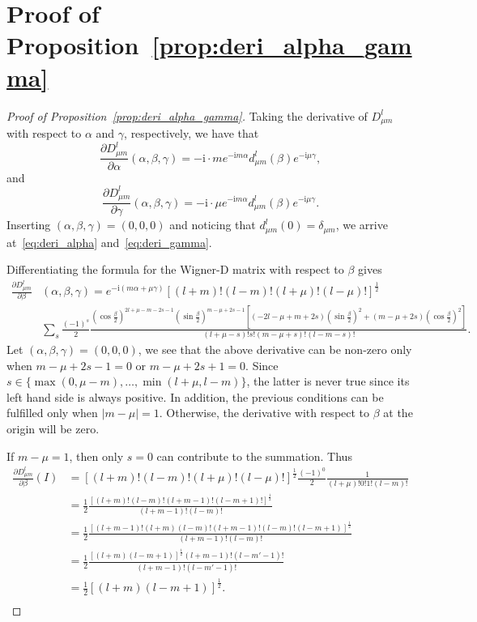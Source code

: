 \documentclass{article}
\numberwithin{equation}{section}
\begin{document}
\section{Proof of Proposition~\ref{prop:deri_alpha_gamma}}\label{app:Wigner-Dmatricesproof}
\begin{proof}[Proof of Proposition~\ref{prop:deri_alpha_gamma}]
Taking the derivative of $D^l_{\mu m}$ with respect to $\alpha$ and $\gamma$, respectively, we have that
\[
    \frac{\partial D^l_{\mu m}}{\partial \alpha}(\alpha, \beta, \gamma)  = -\mathrm{i}\cdot me^{-\mathrm{i}m\alpha}d^l_{\mu m}(\beta)e^{-\mathrm{i}\mu\gamma},
\]
and
\[
    \frac{\partial D^l_{\mu m}}{\partial \gamma}(\alpha, \beta, \gamma)  = -\mathrm{i}\cdot \mu e^{-\mathrm{i}m\alpha}d^l_{\mu m}(\beta)e^{-\mathrm{i}\mu\gamma}.
\]
Inserting $(\alpha,\beta,\gamma) = (0,0,0)$ and noticing that $d_{\mu m}^l(0) = \delta_{\mu m}$, we arrive at~\eqref{eq:deri_alpha} and~\eqref{eq:deri_gamma}.

Differentiating the formula for the Wigner-D matrix with respect to $\beta$ gives
\begin{align*}
    \frac{\partial D^l_{\mu m}}{\partial \beta} & (\alpha, \beta, \gamma) = e^{-\mathrm{i}(m\alpha+ \mu\gamma)} [(l+m)!(l-m)!(l+\mu)!(l-\mu)!]^{\frac12} \\ &\sum_s \frac{(-1)^{s}}{2}\frac{(\cos\frac{\beta}{2})^{2l + \mu - m - 2s - 1}(\sin\frac{\beta}{2})^{m-\mu+2s-1}[(-2l-\mu+m+2s)(\sin\frac{\beta}{2})^2 + (m-\mu+2s)(\cos\frac{\beta}{2})^2]}{(l+\mu-s)!s! (m-\mu+s)!(l-m-s)!}.
\end{align*}
Let $(\alpha,\beta,\gamma) = (0,0,0)$, we see that the above derivative can be non-zero only when $m-\mu+2s-1=0$ or $m-\mu+2s+1=0$. Since $s\in \{\max(0, \mu-m),\ldots,\min(l+\mu,l-m)\}$, the latter is never true since its left hand side is always positive. In addition, the previous conditions can be fulfilled only when $|m-\mu| = 1$. Otherwise, the derivative with respect to $\beta$ at the origin will be zero.

If $m-\mu=1$, then only $s=0$ can contribute to the summation. Thus 
\begin{align*}
    \frac{\partial D^l_{\mu m}}{\partial \beta}(I)
    & = [(l+m)!(l-m)!(l+\mu)!(l-\mu)!]^{\frac{1}{2}}\frac{(-1)^{0}}{2}\frac{1}{(l+\mu)!0!1!(l-m)!} \\
    & = \frac{1}{2}\frac{[(l+m)!(l-m)!(l+m-1)!(l-m+1)!]^{\frac{1}{2}}}{(l+m-1)!(l-m)!} \\
    & = \frac{1}{2}\frac{[(l+m-1)!(l+m)(l-m)!(l+m-1)!(l-m)!(l-m+1)]^{\frac{1}{2}}}{(l+m-1)!(l-m)!} \\
    & = \frac{1}{2}\frac{[(l+m)(l-m+1)]^{\frac{1}{2}}(l+m-1)!(l-m'-1)!}{(l+m-1)!(l-m'-1)!} \\
    & = \frac{1}{2}[(l+m)(l-m+1)]^{\frac{1}{2}}. \\
\end{align*}


\end{proof}
\end{document}
